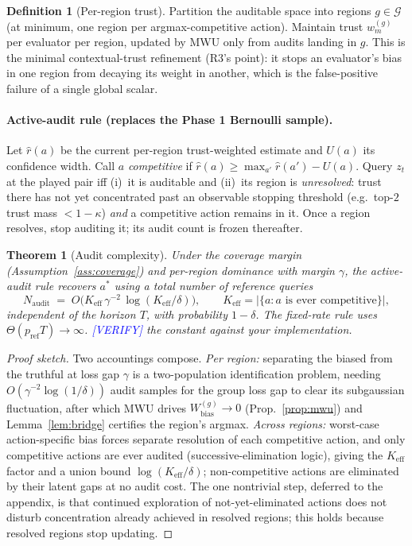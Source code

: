 \documentclass[11pt]{article}
\newtheorem{theorem}{Theorem}
\theoremstyle{definition}
\newtheorem{definition}{Definition}
\theoremstyle{remark}
\newcommand{\astar}{a^{\ast}}
\begin{document}
\begin{definition}[Per-region trust]
\label{def:regiontrust}
Partition the auditable space into regions $g\in\mathcal G$ (at minimum, one region per
argmax-competitive action). Maintain trust $w_m^{(g)}$ per evaluator per region, updated by MWU
only from audits landing in $g$. This is the minimal contextual-trust refinement (R3's point): it
stops an evaluator's bias in one region from decaying its weight in another, which is the
false-positive failure of a single global scalar.
\end{definition}

\paragraph{Active-audit rule (replaces the Phase 1 Bernoulli sample).}
Let $\hat r(a)$ be the current per-region trust-weighted estimate and $U(a)$ its confidence width.
Call $a$ \emph{competitive} if $\hat r(a)\ge \max_{a'}\hat r(a')-U(a)$. Query $z_t$ at the played
pair iff (i)~it is auditable and (ii)~its region is \emph{unresolved}: trust there has not yet
concentrated past an observable stopping threshold (e.g.\ top-$2$ trust mass $<1-\kappa$)
\emph{and} a competitive action remains in it. Once a region resolves, stop auditing it; its audit
count is frozen thereafter.

\begin{theorem}[Audit complexity]
\label{thm:audit}
Under the coverage margin (Assumption~\ref{ass:coverage}) and per-region dominance with margin
$\gamma$, the active-audit rule recovers $\astar$ using a total number of reference queries
\[
N_{\mathrm{audit}} \;=\; O\!\big(K_{\mathrm{eff}}\,\gamma^{-2}\,\log(K_{\mathrm{eff}}/\delta)\big),
\qquad K_{\mathrm{eff}}=\big|\{a: a\text{ is ever competitive}\}\big|,
\]
\emph{independent of the horizon $T$}, with probability $1-\delta$. The fixed-rate rule uses
$\Theta(p_{\mathrm{ref}}T)\to\infty$. \textcolor{blue}{[VERIFY]} the constant against your
implementation.
\end{theorem}

\begin{proof}[Proof sketch]
Two accountings compose. \emph{Per region:} separating the biased from the truthful at loss gap
$\gamma$ is a two-population identification problem, needing $O(\gamma^{-2}\log(1/\delta))$ audit
samples for the group loss gap to clear its subgaussian fluctuation, after which MWU drives
$W_{\mathrm{bias}}^{(g)}\!\to 0$ (Prop.~\ref{prop:mwu}) and Lemma~\ref{lem:bridge} certifies the
region's argmax. \emph{Across regions:} worst-case action-specific bias forces separate resolution
of each competitive action, and only competitive actions are ever audited (successive-elimination
logic), giving the $K_{\mathrm{eff}}$ factor and a union bound $\log(K_{\mathrm{eff}}/\delta)$;
non-competitive actions are eliminated by their latent gaps at no audit cost. The one nontrivial
step, deferred to the appendix, is that continued exploration of not-yet-eliminated actions does
not disturb concentration already achieved in resolved regions; this holds because resolved regions
stop updating.
\end{proof}
\end{document}
